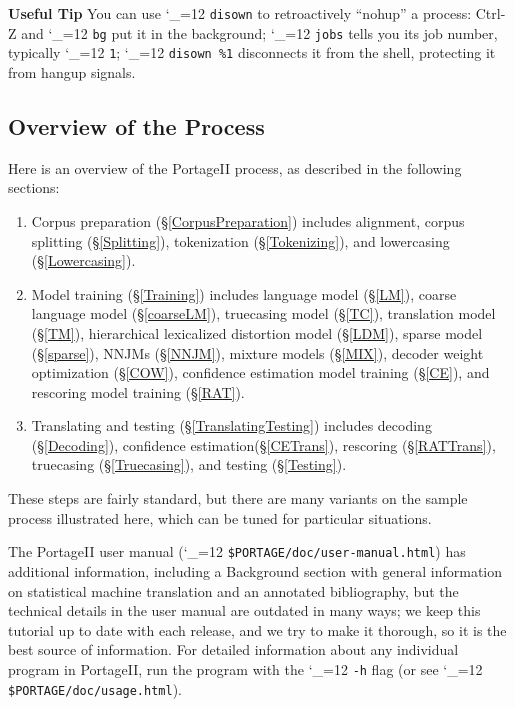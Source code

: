\documentclass[11pt,letterpaper]{article}
\newcommand{\TODO}[1]{\emph{\textbf{\textcolor{red}{<TODO> #1 </TODO>}}}}
\newcommand{\PS}{PortageII\xspace}
\def\code{\begingroup\catcode`\_=12 \codex}
\newcommand{\codex}[1]{\texttt{#1}\endgroup}
\newcommand{\tip}{\textbf{Useful Tip \large{\ding{43}} }}
\newcommand{\margintip}{\marginpar[{\textbf{Tip \large{\ding{43}}}}]{\textbf{\reflectbox{\large{\ding{43}}} Tip}}}
\newcommand{\tipend}{\textbf{ \reflectbox{\large{\ding{43}}}}}
\begin{document}
\tip\margintip You can use \code{disown} to retroactively ``nohup'' a process:
Ctrl-Z and \code{bg} put it in the background; \code{jobs} tells you its job
number, typically \code{1}; \code{disown \%1} disconnects it from the shell,
protecting it from hangup signals.\tipend

\subsection{Overview of the Process}


Here is an overview of the \PS process, as described in the following
sections:
\begin{enumerate}
\item Corpus preparation (\S\ref{CorpusPreparation}) includes
      alignment,
      corpus splitting (\S\ref{Splitting}),
      tokenization (\S\ref{Tokenizing}),
      and
      lowercasing (\S\ref{Lowercasing}).
\item Model training (\S\ref{Training}) includes
      language model (\S\ref{LM}),
      coarse language model (\S\ref{coarseLM}),
      truecasing model (\S\ref{TC}),
      translation model (\S\ref{TM}),
      hierarchical lexicalized distortion model (\S\ref{LDM}),
      sparse model (\S\ref{sparse}),
      NNJMs (\S\ref{NNJM}),
      mixture models (\S\ref{MIX}),
      decoder weight optimization (\S\ref{COW}),
      confidence estimation model training (\S\ref{CE}),
      and
      rescoring model training (\S\ref{RAT}).
\item Translating and testing (\S\ref{TranslatingTesting}) includes
      decoding (\S\ref{Decoding}),
      confidence estimation(\S\ref{CETrans}),
      rescoring (\S\ref{RATTrans}),
      truecasing (\S\ref{Truecasing}),
      and
      testing (\S\ref{Testing}).
\end{enumerate}
These steps are fairly standard, but there are many variants on the
sample process illustrated here, which can be tuned for particular situations.

The \PS user manual (\code{\$PORTAGE/doc/user-manual.html})
has additional information, including a Background section with general
information on statistical machine translation and an annotated bibliography, but the technical details in
the user manual are outdated in many ways; we keep this tutorial up to date
with each release, and we try to make it thorough, so it is the best source of
information.  For detailed information about any individual program in \PS, run
the program with the \code{-h} flag (or see \code{\$PORTAGE/doc/usage.html}).
\end{document}
